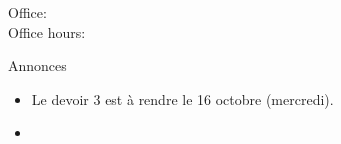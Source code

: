 \documentclass{beamer}
\subtitle[Métier et \lexi{c'est} et \lexi{il est}]{Les métiers et \lexi{c'est} contre \lexi{il est}}
\begin{document}
  \begin{frame}
    \titlepage
    \tiny{Office: \\
          Office hours: }
  \end{frame}

  \begin{frame}{Annonces }
    \begin{itemize}
      \item Le devoir 3 est à rendre le 16 octobre (mercredi).
      \item[] 
    \end{itemize}
  \end{frame}

\end{document}
